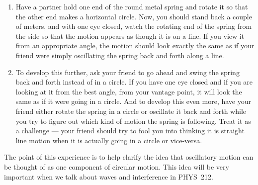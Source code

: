 \begin{exercise}
  \begin{enumerate}
  \item Have a partner hold one end of the round metal spring and
    rotate it so that the other end makes a horizontal circle.  Now,
    you should stand back a couple of meters, and with one eye closed,
    watch the rotating end of the spring from the side so that the
    motion appears as though it is on a line.  If you view it from an
    appropriate angle, the motion should look exactly the same as if
    your friend were simply oscillating the spring back and forth
    along a line.

  \item To develop this further, ask your friend to go ahead and swing
    the spring back and forth instead of in a circle.  If you have one
    eye closed and if you are looking at it from the best angle, from
    your vantage point, it will look the same as if it were going in a
    circle.  And to develop this even more, have your friend either
    rotate the spring in a circle or oscillate it back and forth while
    you try to figure out which kind of motion the spring is
    following.  Treat it as a challenge --- your friend should try to
    fool you into thinking it is straight line motion when it is
    actually going in a circle or vice-versa.
  \end{enumerate}

  The point of this experience is to help clarify the idea that
  oscillatory motion can be thought of as one component of circular
  motion.  This idea will be very important when we talk about waves
  and interference in PHYS~212.
\label{prob:circ_vs_osc}
\end{exercise}





